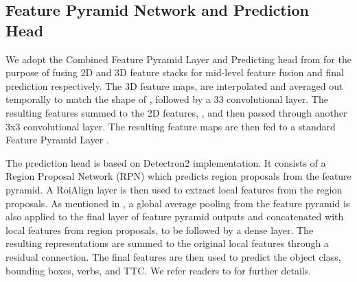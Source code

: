 \documentclass[10pt,twocolumn,letterpaper]{article}
\begin{document}
\begin{table}
\caption{Guided Attention fusion prediction for each output layer of 3D CNN. Results in Top-5 mean Average Precision on the validation set of EGO4D v2.}
\label{table:fusion_layer}
\end{table}

\subsection{Feature Pyramid Network and Prediction Head} 
We adopt the Combined Feature Pyramid Layer and Predicting head from \cite{ragusa2023stillfast} for the purpose of fusing 2D and 3D feature stacks for mid-level feature fusion and final prediction respectively. The 3D feature maps,  are interpolated and averaged out temporally to match the shape of , followed by a 33 convolutional layer. The resulting features summed to the 2D features, , and then passed through another 3x3 convolutional layer. The resulting feature maps are then fed to a standard Feature Pyramid Layer \cite{FPN}.  

The prediction head is based on Detectron2 \cite{wu2019detectron2} implementation. It consists of a Region Proposal Network (RPN) which predicts region proposals from the feature pyramid. A RoiAlign layer is then used to extract local features from the region proposals. As mentioned in \cite{ragusa2023stillfast}, a global average pooling from the feature pyramid is also applied to the final layer of feature pyramid outputs and concatenated with local features from region proposals, to be followed by a dense layer. The resulting representations are summed to the original local features through a residual connection. The final features are then used to predict the object class, bounding boxes, verbs, and TTC.  We refer readers to \cite{ragusa2023stillfast} for further details. 
\end{document}
